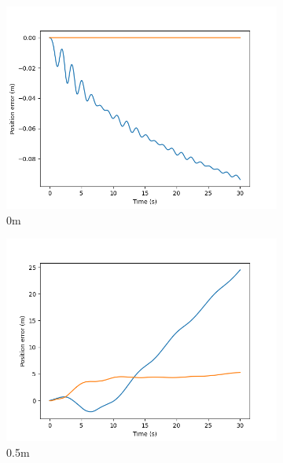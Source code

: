 \documentclass[class=article, crop=false]{standalone}
\begin{document}
\begin{figure}
    \centering
    \begin{subfigure}[b]{0.48\textwidth}
        \centering
        \includegraphics{scenario1/rov-50m/0.0m/usv_pos_error_uncontrolled}
        \caption{0m}
        \label{}
    \end{subfigure}
    \hfill
        \begin{subfigure}[b]{0.48\textwidth}
        \centering
        \includegraphics{scenario1/rov-50m/0.5m/usv_pos_error_uncontrolled}
        \caption{0.5m}
        \label{}
    \end{subfigure}
    \vfill
        \begin{subfigure}[b]{0.48\textwidth}
        \centering

\end{subfigure}
\end{figure}
\end{document}
